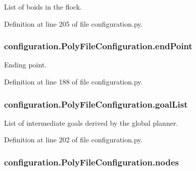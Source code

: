 List of boids in the flock. 



Definition at line 205 of file configuration.\-py.

\hypertarget{classconfiguration_1_1PolyFileConfiguration_acb9da93ddecef1bb34bbce601473f0f1}{
\subsubsection[{end\-Point}]{\setlength{\rightskip}{0pt plus 5cm}configuration.\-Poly\-File\-Configuration.\-end\-Point}}\label{classconfiguration_1_1PolyFileConfiguration_acb9da93ddecef1bb34bbce601473f0f1}


Ending point. 



Definition at line 188 of file configuration.\-py.

\hypertarget{classconfiguration_1_1PolyFileConfiguration_a2fd4dfe65bb97105e3ff146d125849df}{
\subsubsection[{goal\-List}]{\setlength{\rightskip}{0pt plus 5cm}configuration.\-Poly\-File\-Configuration.\-goal\-List}}\label{classconfiguration_1_1PolyFileConfiguration_a2fd4dfe65bb97105e3ff146d125849df}


List of intermediate goals derived by the global planner. 



Definition at line 202 of file configuration.\-py.

\hypertarget{classconfiguration_1_1PolyFileConfiguration_a38883bf395763bf87ad3ca8279f0300f}{
\subsubsection[{nodes}]{\setlength{\rightskip}{0pt plus 5cm}configuration.\-Poly\-File\-Configuration.\-nodes}}\label{classconfiguration_1_1PolyFileConfiguration_a38883bf395763bf87ad3ca8279f0300f}


